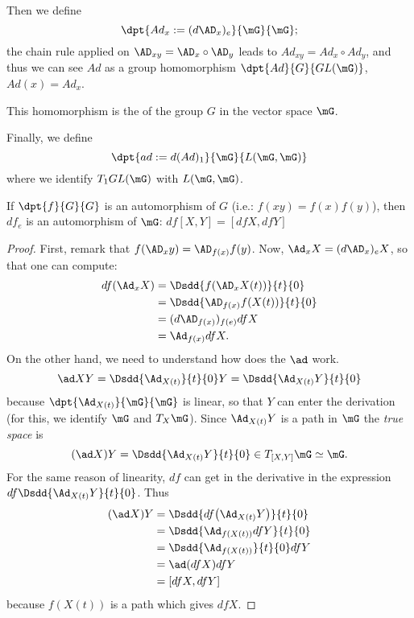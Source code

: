 Then we define
\[
\dpt{Ad_x:=(d\AD_x)_e}{\mG}{\mG};
\]
the chain rule applied on $\AD_{xy}=\AD_x\circ\AD_y$ leads to $Ad_{xy}=Ad_x\circ Ad_y$, and thus we can see $Ad$ as a group homomorphism $\dpt{Ad}{G}{GL(\mG)}$, $Ad(x)=Ad_x$.

\begin{definition}
This homomorphism is the  of the group $G$ in the vector space $\mG$.
\end{definition}


Finally, we define
\[
 \dpt{ad:=d(Ad)_1}{\mG}{L(\mG,\mG)}
\]
 where we identify $T_1GL(\mG)$ with $L(\mG,\mG)$.

\begin{lemma}\label{LEMooEALFooJOeOgk}
    If $\dpt{f}{G}{G}$ is an automorphism of $G$ (i.e.: $f(xy)=f(x)f(y)$), then $df_e$ is an automorphism of $\mG$: $df[X,Y]=[df X,dfY]$
\end{lemma}

\begin{proof}
First, remark that $f(\AD_xy)=\AD_{f(x)}f(y)$. Now, $\Ad_x X=(d\AD_x)_eX$, so that one can compute:
\begin{equation}
\begin{split}
   df(\Ad_xX)&=\Dsdd{f(\AD_xX(t))}{t}{0}\\
             &=\Dsdd{   \AD_{f(x)}f(X(t))  }{t}{0}\\
	     &=(d\AD_{f(x)})_{f(e)}df X\\
	     &=\Ad_{f(x)}df X.
\end{split}
\end{equation}
On the other hand, we need to understand how does the $\ad$ work.
\[
  \ad XY=\Dsdd{\Ad_{X(t)}}{t}{0}Y=\Dsdd{\Ad_{X(t)}Y}{t}{0}
\]
because $\dpt{\Ad_{X(t)}}{\mG}{\mG}$ is linear, so that $Y$ can enter the derivation (for this, we identify $\mG$ and $T_X\mG$). Since $\Ad_{X(t)}Y$ is a path in $\mG$ the \emph{true space} is
\[
(\ad X)Y=\Dsdd{ \Ad_{X(t)}Y }{t}{0}\in T_{[X,Y]}\mG\simeq\mG.
\]
For the same reason of linearity, $df$ can get in the derivative in the expression $df\Dsdd{  \Ad_{X(t)}Y  }{t}{0}$. Thus
\begin{equation}
\begin{split}
(\ad X)Y&=\Dsdd{  df\big(\Ad_{X(t)}Y\big)  }{t}{0}\\
        &=\Dsdd{  \Ad_{ f(X(t)) }df Y  }{t}{0}\\
	&=\Dsdd{ \Ad_{f(X(t))} }{t}{0}df Y\\
	&=\ad(dfX)df Y\\
	&=[dfX,df Y]
\end{split}
\end{equation}
because $f(X(t))$ is a path which gives $df X$.
\end{proof}

